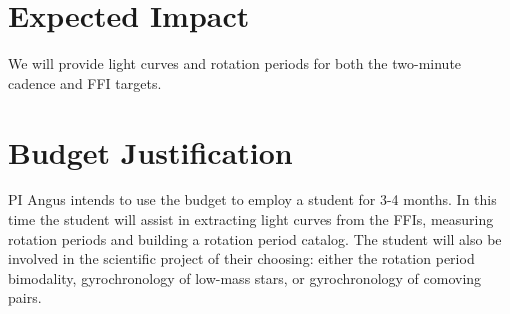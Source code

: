 \documentclass[useAMS, usenatbib, preprint, 12pt]{aastex}
\begin{document}

\section{Expected Impact}
We will provide light curves and rotation periods for both the two-minute
cadence and FFI targets.

\section{Budget Justification}
PI Angus intends to use the budget to employ a student for 3-4 months.
In this time the student will assist in extracting light curves from the FFIs,
measuring rotation periods and building a rotation period catalog.
The student will also be involved in the scientific project of their choosing:
either the rotation period bimodality, gyrochronology of low-mass stars, or
gyrochronology of comoving pairs.


\end{document}
